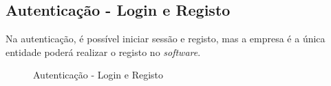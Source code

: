 \newpage

\subsection{Autenticação - Login e Registo}

Na autenticação, é possível iniciar sessão e registo, mas a empresa é a única entidade poderá realizar o registo no \textit{software}.

\begin{figure}[htb]%
    \centering
    \qquad
    \caption{Autenticação - Login e Registo}%
    \label{fig:24}
\end{figure}

